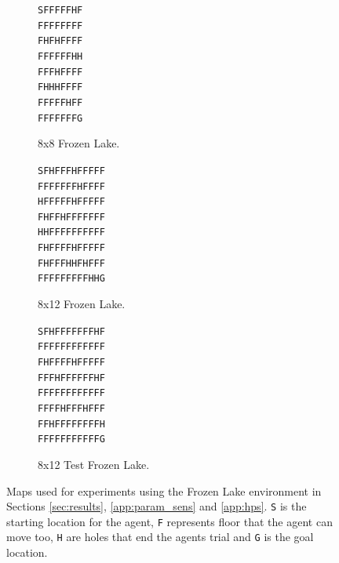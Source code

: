 \documentclass{article}
\theoremstyle{plain}
\begin{document}
\begin{appendices}
        \begin{figure}
             \centering
             \begin{subfigure}[b]{0.3\textwidth}
                 \centering
                 \texttt{SFFFFFHF} \\
                 \texttt{FFFFFFFF} \\
                 \texttt{FHFHFFFF} \\
                 \texttt{FFFFFFHH} \\
                 \texttt{FFFHFFFF} \\
                 \texttt{FHHHFFFF} \\
                 \texttt{FFFFFHFF} \\
                 \texttt{FFFFFFFG} 
                 \caption{8x8 Frozen Lake.}
                 \label{fig:fl8}
             \end{subfigure}
             \hfill
             \begin{subfigure}[b]{0.3\textwidth}
                 \centering
                 \texttt{SFHFFFHFFFFF} \\
                 \texttt{FFFFFFFHFFFF} \\
                 \texttt{HFFFFFHFFFFF} \\
                 \texttt{FHFFHFFFFFFF} \\
                 \texttt{HHFFFFFFFFFF} \\
                 \texttt{FHFFFFHFFFFF} \\
                 \texttt{FHFFFHHFHFFF} \\
                 \texttt{FFFFFFFFFHHG} 
                 \caption{8x12 Frozen Lake.}
                 \label{fig:fl12}
             \end{subfigure}
             \hfill
             \begin{subfigure}[b]{0.3\textwidth}
                 \centering
                 \texttt{SFHFFFFFFFHF} \\
                 \texttt{FFFFFFFFFFFF} \\
                 \texttt{FHFFFFHFFFFF} \\
                 \texttt{FFFHFFFFFFHF} \\
                 \texttt{FFFFFFFFFFFF} \\
                 \texttt{FFFFHFFFHFFF} \\
                 \texttt{FFHFFFFFFFFH} \\
                 \texttt{FFFFFFFFFFFG} 
                 \caption{8x12 Test Frozen Lake.}
                 \label{fig:fl12test}
            \end{subfigure}
            \caption{Maps used for experiments using the Frozen Lake environment in Sections \ref{sec:results}, \ref{app:param_sens} and \ref{app:hps}. \texttt{S} is the starting location for the agent, \texttt{F} represents floor that the agent can move too, \texttt{H} are holes that end the agents trial and \texttt{G} is the goal location.}
                \label{fig:maps}
        \end{figure}
    

\end{appendices}
\end{document}
